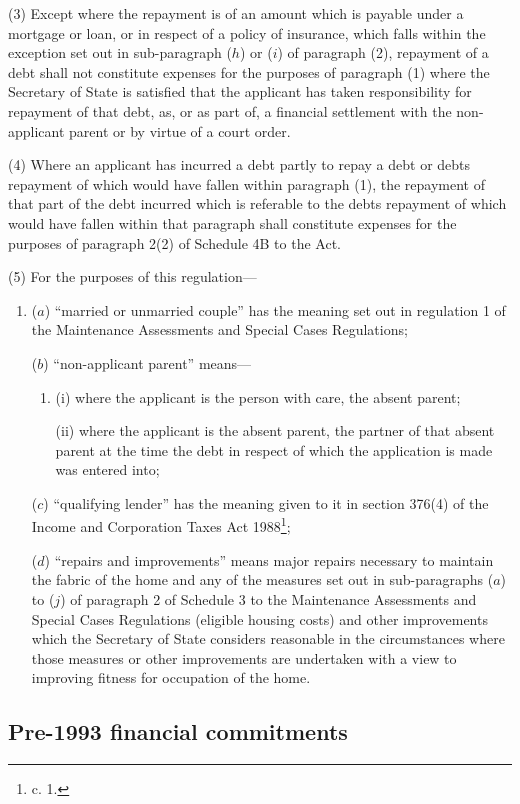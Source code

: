 \documentclass[12pt,a4paper]{article}
\begin{document}
(3) Except where the repayment is of an amount which is payable under a mortgage
or loan, or in respect of a policy of insurance, which falls within the
exception set out in sub-paragraph ($h$) or ($i$) of paragraph (2), repayment of a
debt shall not constitute expenses for the purposes of paragraph (1) where the
Secretary of State is satisfied that the applicant has taken responsibility for
repayment of that debt, as, or as part of, a financial settlement with the
non-applicant parent or by virtue of a court order.

(4) Where an applicant has incurred a debt partly to repay a debt or debts
repayment of which would have fallen within paragraph (1), the repayment of that
part of the debt incurred which is referable to the debts repayment of which
would have fallen within that paragraph shall constitute expenses for the
purposes of paragraph 2(2) of Schedule 4B to the Act.

(5) For the purposes of this regulation—
\begin{enumerate}\item[]
($a$) “married or unmarried couple” has the meaning set out in regulation 1 of the
Maintenance Assessments and Special Cases Regulations;

($b$) “non-applicant parent” means—
\begin{enumerate}\item[]
(i) where the applicant is the person with care, the absent parent;

(ii) where the applicant is the absent parent, the partner of that absent parent
at the time the debt in respect of which the application is made was entered
into;
\end{enumerate}

($c$) “qualifying lender” has the meaning given to it in section 376(4) of the
Income and Corporation Taxes Act 1988\footnote{ c. 1.};

($d$) “repairs and improvements” means major repairs necessary to maintain the
fabric of the home and any of the measures set out in sub-paragraphs ($a$) to ($j$)
of paragraph 2 of Schedule 3 to the Maintenance Assessments and Special Cases
Regulations (eligible housing costs) and other improvements which the Secretary
of State considers reasonable in the circumstances where those measures or other
improvements are undertaken with a view to improving fitness for occupation of
the home.
\end{enumerate}

\subsection[17. Pre-1993 financial commitments]{Pre-1993 financial commitments}
\end{document}
